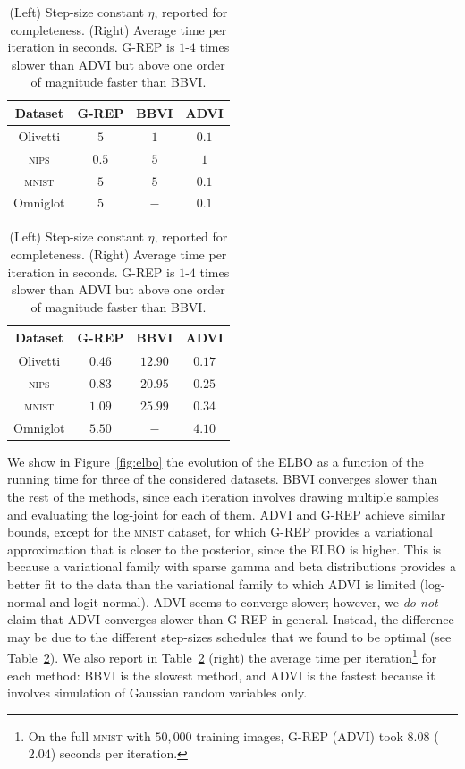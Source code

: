 \begin{table}[t]
  \small
  \centering
  \begin{tabular}{cccc}\toprule
     \textbf{Dataset} & \acrshort{G-REP} & \gls{BBVI} & \gls{ADVI} \\ \hline
     Olivetti & $5$ & $1$ & $0.1$ \\ 
     \textsc{nips} & $0.5$ & $5$ & $1$ \\ 
     \textsc{mnist} & $5$ & $5$ & $0.1$ \\ 
     Omniglot & $5$ & $-$ & $0.1$ \\ \bottomrule
  \end{tabular}
  \hspace*{30pt}
  \begin{tabular}{cccc}\toprule
     \textbf{Dataset} & \acrshort{G-REP} & \gls{BBVI} & \gls{ADVI} \\ \hline
     Olivetti     & $0.46$  & $12.90$ & $0.17$ \\ 
     \textsc{nips}  & $0.83$  & $20.95$ & $0.25$ \\ 
     \textsc{mnist} & $1.09$  & $25.99$ & $0.34$ \\ 
     Omniglot     & $5.50$  & $-$   & $4.10$ \\ \bottomrule
  \end{tabular}
  \caption{\label{tab:eta_and_runtime}(Left) Step-size constant $\eta$, reported for completeness. (Right) Average time per iteration in seconds. \acrshort{G-REP} is $1$-$4$ times slower than \gls{ADVI} but above one order of magnitude faster than \gls{BBVI}.}
  \vspace*{-9pt}
\end{table}

\vspace*{-1pt}
We show in Figure~\ref{fig:elbo} the evolution of the \gls{ELBO} as a function of the running time for three of the considered datasets. \gls{BBVI} converges slower than the rest of the methods, since each iteration involves drawing multiple samples and evaluating the log-joint for each of them. \gls{ADVI} and \acrshort{G-REP} achieve similar bounds, except for the \textsc{mnist} dataset, for which \acrshort{G-REP} provides a variational approximation that is closer to the posterior, since the \gls{ELBO} is higher. This is because a variational family with sparse gamma and beta distributions provides a better fit to the data than the variational family to which \gls{ADVI} is limited (log-normal and logit-normal). \gls{ADVI} seems to converge slower; however, we \emph{do not} claim that \gls{ADVI} converges slower than \acrshort{G-REP} in general. Instead, the difference may be due to the different step-sizes schedules that we found to be optimal (see Table~\ref{tab:eta_and_runtime}). We also report in Table~\ref{tab:eta_and_runtime} (right) the average time per iteration\footnote{%
	On the full \textsc{mnist} with $50,000$ training images, \acrshort{G-REP} (\acrshort{ADVI}) took $8.08$ ($2.04$) seconds per iteration.
} for each method: \gls{BBVI} is the slowest method, and \gls{ADVI} is the fastest because it involves simulation of Gaussian random variables only.


